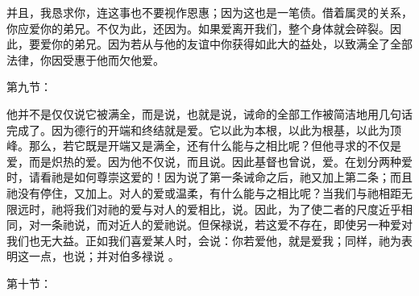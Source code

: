 \par

并且，我恳求你，连这事也不要视作恩惠；因为这也是一笔债。借着属灵的关系，你应爱你的弟兄。不仅为此，还因为。如果爱离开我们，整个身体就会碎裂。因此，要爱你的弟兄。因为若从与他的友谊中你获得如此大的益处，以致满全了全部法律，你因受惠于他而欠他爱。\par

第九节：\par

他并不是仅仅说它被满全，而是说，也就是说，诫命的全部工作被简洁地用几句话完成了。因为德行的开端和终结就是爱。它以此为本根，以此为根基，以此为顶峰。那么，若它既是开端又是满全，还有什么能与之相比呢？但他寻求的不仅是爱，而是炽热的爱。因为他不仅说，而且说。因此基督也曾说，爱。在划分两种爱时，请看祂是如何尊崇这爱的！因为说了第一条诫命之后，祂又加上第二条；而且祂没有停住，又加上。对人的爱或温柔，有什么能与之相比呢？当我们与祂相距无限远时，祂将我们对祂的爱与对人的爱相比，说。因此，为了使二者的尺度近乎相同，对一条祂说，而对近人的爱祂说。但保禄说，若这爱不存在，即使另一种爱对我们也无大益。正如我们喜爱某人时，会说：你若爱他，就是爱我；同样，祂为表明这一点，也说；并对伯多禄说 。\par

第十节：\par

